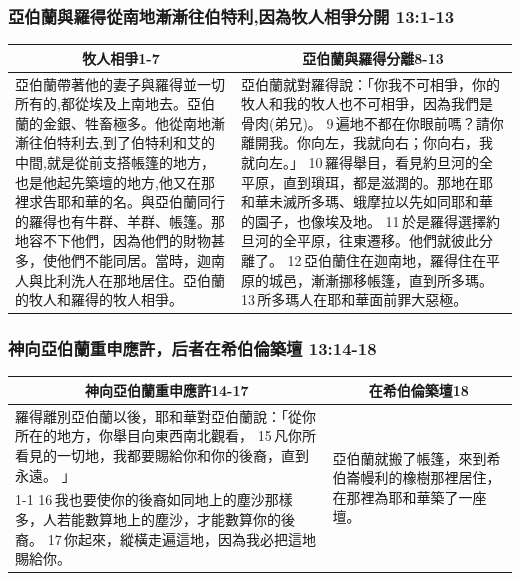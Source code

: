 \subsubsection{亞伯蘭與羅得從南地漸漸往伯特利,因為牧人相爭分開 13:1-13}
\noindent
\begin{table}[H]
\centering
\begin{tabular}{p{7.75cm}|p{9.50cm}}\hline\hline
\multicolumn{1}{c|}{牧人相爭1-7}&\multicolumn{1}{c}{亞伯蘭與羅得分離8-13}\\\hline
亞伯蘭帶著他的妻子與羅得並一切所有的,都從埃及上南地去。亞伯蘭的金銀、牲畜極多。他從南地漸漸往伯特利去,到了伯特利和艾的中間,就是從前支搭帳篷的地方，也是他起先築壇的地方,他又在那裡求告耶和華的名。與亞伯蘭同行的羅得也有牛群、羊群、帳篷。那地容不下他們，因為他們的財物甚多，使他們不能同居。當時，迦南人與比利洗人在那地居住。亞伯蘭的牧人和羅得的牧人相爭。
&亞伯蘭就對羅得說：「你我不可相爭，你的牧人和我的牧人也不可相爭，因為我們是骨肉(弟兄)。 9 遍地不都在你眼前嗎？請你離開我。你向左，我就向右；你向右，我就向左。」 10 羅得舉目，看見約旦河的全平原，直到瑣珥，都是滋潤的。那地在耶和華未滅所多瑪、蛾摩拉以先如同耶和華的園子，也像埃及地。 11 於是羅得選擇約旦河的全平原，往東遷移。他們就彼此分離了。 12 亞伯蘭住在迦南地，羅得住在平原的城邑，漸漸挪移帳篷，直到所多瑪。 13 所多瑪人在耶和華面前罪大惡極。\\\hline
\end{tabular}
\end{table}


\subsubsection{神向亞伯蘭重申應許，后者在希伯倫築壇 13:14-18}
\begin{table}[H]
\centering
\begin{tabular}{p{11.75cm}|p{5.50cm}}\hline\hline
\multicolumn{1}{c|}{神向亞伯蘭重申應許14-17}&\multicolumn{1}{c}{在希伯倫築壇18}\\\hline
羅得離別亞伯蘭以後，耶和華對亞伯蘭說：「從你所在的地方，你舉目向東西南北觀看， 15 凡你所看見的一切地，我都要賜給你和你的後裔，直到永遠。 」 
&\multirow{2}{5.8cm}{亞伯蘭就搬了帳篷，來到希伯崙幔利的橡樹那裡居住，在那裡為耶和華築了一座壇。}\\\cline{1-1}
16 我也要使你的後裔如同地上的塵沙那樣多，人若能數算地上的塵沙，才能數算你的後裔。 17 你起來，縱橫走遍這地，因為我必把這地賜給你。&\\\hline
\end{tabular}
\end{table}



